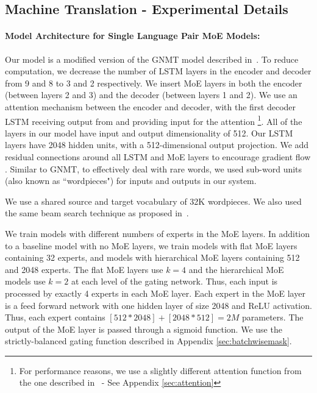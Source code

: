 \documentclass{article}
\begin{document}
\subsection{Machine Translation - Experimental Details}
\label{sec:appendixmt}

\paragraph{Model Architecture for Single Language Pair MoE Models:} Our model is a modified version of the GNMT model described in~\citep{GNMT}.  To reduce computation, we decrease the number of LSTM layers in the encoder and decoder from 9 and 8 to 3 and 2 respectively.  We insert MoE layers in both the encoder (between layers 2 and 3) and the decoder (between layers 1 and 2). We use an attention mechanism between the encoder and decoder, with the first decoder LSTM receiving output from and providing input for the attention \footnote{For performance reasons, we use a slightly different attention function from the one described in~\citep{GNMT} - See Appendix \ref{sec:attention}}.  All of the layers in our model have input and output dimensionality of 512. Our LSTM layers have 2048 hidden units, with a 512-dimensional output projection.   We add residual connections around all LSTM and MoE layers to encourage gradient flow \citep{HeZRS:2015:DRL}. Similar to GNMT, to effectively deal with rare words, we used sub-word units (also known as ``wordpieces") \citep{Schuster:2012:JKVS} for inputs and outputs in our system. 

We use a shared source and target vocabulary of 32K wordpieces. We also used the same beam search technique as proposed in~\citep{GNMT}. 

We train models with different numbers of experts in the MoE layers.  In addition to a baseline model with no MoE layers, we train models with flat MoE layers containing 32 experts, and models with hierarchical MoE layers containing 512 and 2048 experts.  The flat MoE layers use $k=4$ and the hierarchical MoE models use $k=2$ at each level of the gating network. Thus, each input is processed by exactly 4 experts in each MoE layer.  Each expert in the MoE layer is a feed forward network with one hidden layer of size 2048 and ReLU activation.  Thus, each expert contains $[512 * 2048] + [2048 * 512] = 2M$ parameters.  The output of the MoE layer is passed through a sigmoid function.   We use the strictly-balanced gating function described in Appendix \ref{sec:batchwisemask}.
\end{document}
